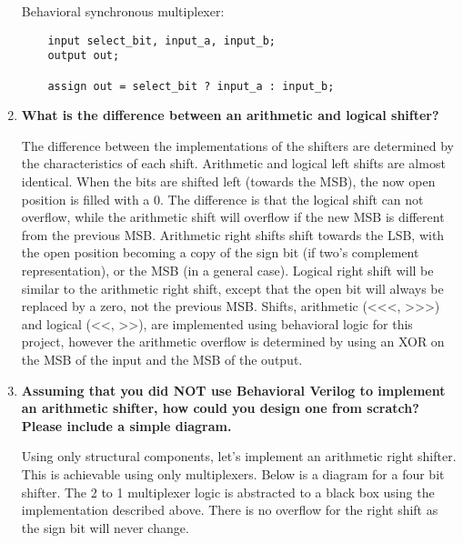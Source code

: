 \documentclass[11pt]{article}
\begin{document}
\begin{enumerate}
	Behavioral synchronous multiplexer:
	
	\begin{lstlisting}
	input select_bit, input_a, input_b;
	output out;
	
	assign out = select_bit ? input_a : input_b;
	\end{lstlisting}
	
	\item \textbf{What is the difference between an arithmetic and logical shifter?}
	
	The difference between the implementations of the shifters are determined by the characteristics of each shift. Arithmetic and logical left shifts are almost identical. When the bits are shifted left (towards the MSB), the now open position is filled with a 0. The difference is that the logical shift can not overflow, while the arithmetic shift will overflow if the new MSB is different from the previous MSB. Arithmetic right shifts shift towards the LSB, with the open position becoming a copy of the sign bit (if two's complement representation), or the MSB (in a general case). Logical right shift will be similar to the arithmetic right shift, except that the open bit will always be replaced by a zero, not the previous MSB. Shifts, arithmetic (<<<, >>>) and logical (<<, >>), are implemented using behavioral logic for this project, however the arithmetic overflow is determined by using an XOR on the MSB of the input and the MSB of the output. 
	
	\item \textbf{Assuming that you did NOT use Behavioral Verilog to implement an arithmetic shifter, how could you design one from scratch? Please include a simple diagram.}
	
	Using only structural components, let's implement an arithmetic right shifter. This is achievable using only multiplexers. Below is a diagram for a four bit shifter. The 2 to 1 multiplexer logic is abstracted to a black box using the implementation described above. There is no overflow for the right shift as the sign bit will never change.
	
\end{enumerate}
\end{document}
